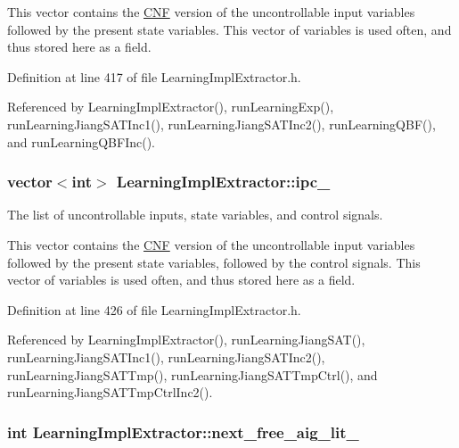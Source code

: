 This vector contains the \hyperlink{classCNF}{C\-N\-F} version of the uncontrollable input variables followed by the present state variables. This vector of variables is used often, and thus stored here as a field. 

Definition at line 417 of file Learning\-Impl\-Extractor.\-h.



Referenced by Learning\-Impl\-Extractor(), run\-Learning\-Exp(), run\-Learning\-Jiang\-S\-A\-T\-Inc1(), run\-Learning\-Jiang\-S\-A\-T\-Inc2(), run\-Learning\-Q\-B\-F(), and run\-Learning\-Q\-B\-F\-Inc().

\hypertarget{classLearningImplExtractor_ab94459731d569bdd6bb0f3895fb9c184}{
\subsubsection[{ipc\-\_\-}]{\setlength{\rightskip}{0pt plus 5cm}vector$<$int$>$ Learning\-Impl\-Extractor\-::ipc\-\_\-\hspace{0.3cm}{\ttfamily [protected]}}}\label{classLearningImplExtractor_ab94459731d569bdd6bb0f3895fb9c184}


The list of uncontrollable inputs, state variables, and control signals. 

This vector contains the \hyperlink{classCNF}{C\-N\-F} version of the uncontrollable input variables followed by the present state variables, followed by the control signals. This vector of variables is used often, and thus stored here as a field. 

Definition at line 426 of file Learning\-Impl\-Extractor.\-h.



Referenced by Learning\-Impl\-Extractor(), run\-Learning\-Jiang\-S\-A\-T(), run\-Learning\-Jiang\-S\-A\-T\-Inc1(), run\-Learning\-Jiang\-S\-A\-T\-Inc2(), run\-Learning\-Jiang\-S\-A\-T\-Tmp(), run\-Learning\-Jiang\-S\-A\-T\-Tmp\-Ctrl(), and run\-Learning\-Jiang\-S\-A\-T\-Tmp\-Ctrl\-Inc2().

\hypertarget{classLearningImplExtractor_a987219dd3114957f2bd0d9df77a9d7fc}{
\subsubsection[{next\-\_\-free\-\_\-aig\-\_\-lit\-\_\-}]{\setlength{\rightskip}{0pt plus 5cm}int Learning\-Impl\-Extractor\-::next\-\_\-free\-\_\-aig\-\_\-lit\-\_\-\hspace{0.3cm}{\ttfamily [protected]}}}\label{classLearningImplExtractor_a987219dd3114957f2bd0d9df77a9d7fc}


